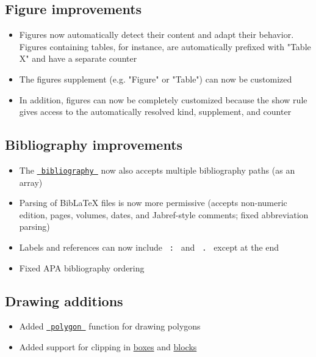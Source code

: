\subsection{Figure improvements}\label{figure-improvements}

\begin{itemize}
\tightlist
\item
  Figures now automatically detect their content and adapt their
  behavior. Figures containing tables, for instance, are automatically
  prefixed with "Table X" and have a separate counter
\item
  The figure\textquotesingle s supplement (e.g. "Figure" or "Table") can
  now be customized
\item
  In addition, figures can now be completely customized because the show
  rule gives access to the automatically resolved kind, supplement, and
  counter
\end{itemize}

\subsection{Bibliography improvements}\label{bibliography-improvements}

\begin{itemize}
\tightlist
\item
  The
  \href{/docs/reference/model/bibliography/}{\texttt{\ bibliography\ }}
  now also accepts multiple bibliography paths (as an array)
\item
  Parsing of BibLaTeX files is now more permissive (accepts non-numeric
  edition, pages, volumes, dates, and Jabref-style comments; fixed
  abbreviation parsing)
\item
  Labels and references can now include \texttt{\ :\ } and
  \texttt{\ .\ } except at the end
\item
  Fixed APA bibliography ordering
\end{itemize}

\subsection{Drawing additions}\label{drawing-additions}

\begin{itemize}
\tightlist
\item
  Added \href{/docs/reference/visualize/polygon/}{\texttt{\ polygon\ }}
  function for drawing polygons
\item
  Added support for clipping in
  \href{/docs/reference/layout/box/\#parameters-clip}{boxes} and
  \href{/docs/reference/layout/block/\#parameters-clip}{blocks}
\end{itemize}

